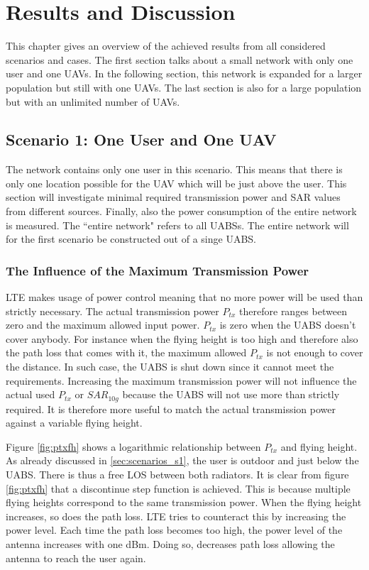 \chapter{Results and Discussion}
\label{chap:results}

This chapter gives an overview of the achieved results from all considered scenarios and cases.
The first section talks about a small network with only one user and one \gls{UAV}s. In 
the following section, this network is expanded for a larger population but still with one \gls{UAV}s.
The last section is also for a large population but with an unlimited number of \gls{UAV}s.

\section{Scenario 1: One User and One \gls{UAV}}
The network contains only one user in this scenario. This means that there is only one location possible for the \gls{UAV} which will 
be just above 
the user. This section will investigate minimal required transmission power and SAR values from different sources.
Finally, also the power consumption of the entire network is measured. The  ``entire network" refers to all \gls{UABS}s. The entire network 
will for the first scenario be constructed out of a singe \gls{UABS}.

\subsection{The Influence of the Maximum Transmission Power}
\label{s1a}
\gls{LTE} makes usage of power control meaning that no more power will be used than strictly necessary. The actual 
transmission power $P_{tx}$ therefore ranges between zero and the maximum allowed input power. $P_{tx}$ is zero when the \gls{UABS} doesn't cover anybody.
For instance when the flying height is too high and therefore also the path loss that comes with it, the maximum allowed $P_{tx}$ is not enough to cover 
the distance. In such case, the \gls{UABS} is shut down since it cannot meet the requirements.
Increasing the maximum transmission power will not influence the actual used $P_{tx}$ or $SAR_{10g}$ because the \gls{UABS} will not use more
than strictly required. It is therefore more useful to match the actual transmission power against a variable flying height. 

Figure \ref{fig:ptxfh} shows a logarithmic relationship between $P_{tx}$ and flying height.
As already discussed in \ref{sec:scenarios_s1}, the user is outdoor and just below the \gls{UABS}. There is thus a free \gls{LOS} between both
radiators. It is clear from figure \ref{fig:ptxfh} that a discontinue step function is achieved. This is because multiple flying heights correspond to the same transmission power.
When the flying height increases, so does the path loss. \gls{LTE} tries to counteract this by increasing the power level. Each time 
the path loss becomes too high, the power level of the antenna increases with one dBm. Doing so, decreases path loss allowing the antenna to reach
the user again. 

